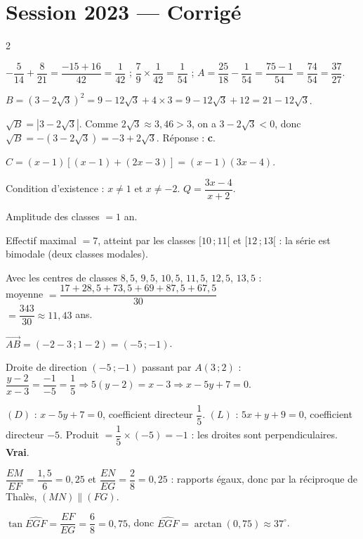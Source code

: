 \section{Session 2023 — Corrigé}
\begin{multicols}{2}

$-\dfrac5{14}+\dfrac8{21}=\dfrac{-15+16}{42}=\dfrac1{42}$ ; $\dfrac79\times\dfrac1{42}=\dfrac1{54}$ ;
$A=\dfrac{25}{18}-\dfrac1{54}=\dfrac{75-1}{54}=\dfrac{74}{54}=\dfrac{37}{27}$.

$B=(3-2\sqrt3)^{2}=9-12\sqrt3+4\times3=9-12\sqrt3+12=21-12\sqrt3$.

$\sqrt B=|3-2\sqrt3|$. Comme $2\sqrt3\approx3{,}46>3$, on a $3-2\sqrt3<0$, donc
$\sqrt B=-(3-2\sqrt3)=-3+2\sqrt3$. Réponse : \textbf{c}.

$C=(x-1)[(x-1)+(2x-3)]=(x-1)(3x-4)$.

Condition d'existence : $x\ne1$ et $x\ne-2$. $Q=\dfrac{3x-4}{x+2}$.

Amplitude des classes $=1$ an.

Effectif maximal $=7$, atteint par les classes $[10\,;11[$ et $[12\,;13[$ : la série est
bimodale (deux classes modales).

Avec les centres de classes $8{,}5$, $9{,}5$, $10{,}5$, $11{,}5$, $12{,}5$, $13{,}5$ :\\
moyenne $=\dfrac{17+28{,}5+73{,}5+69+87{,}5+67{,}5}{30}$\\
$=\dfrac{343}{30}\approx11{,}43$ ans.

$\overrightarrow{AB}=(-2-3\,;1-2)=(-5\,;-1)$.

Droite de direction $(-5\,;-1)$ passant par $A(3\,;2)$ :
$\dfrac{y-2}{x-3}=\dfrac{-1}{-5}=\dfrac15\Rightarrow5(y-2)=x-3\Rightarrow x-5y+7=0$.

$(D)$ : $x-5y+7=0$, coefficient directeur $\dfrac15$. $(L)$ : $5x+y+9=0$, coefficient
directeur $-5$. Produit $=\dfrac15\times(-5)=-1$ : les droites sont perpendiculaires.
\textbf{Vrai}.

$\dfrac{EM}{EF}=\dfrac{1{,}5}6=0{,}25$ et $\dfrac{EN}{EG}=\dfrac28=0{,}25$ : rapports
égaux, donc par la réciproque de Thalès, $(MN)\parallel(FG)$.

$\tan\widehat{EGF}=\dfrac{EF}{EG}=\dfrac68=0{,}75$, donc
$\widehat{EGF}=\arctan(0{,}75)\approx37^{\circ}$.


\end{multicols}
